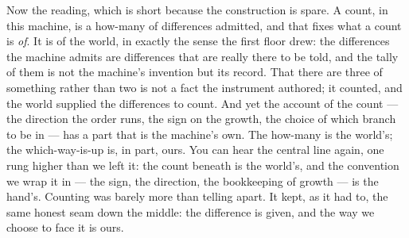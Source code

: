 Now the reading, which is short because the construction is spare. A count, in this machine, is a how-many of
differences admitted, and that fixes what a count is \emph{of}. It is of the world, in exactly the sense the
first floor drew: the differences the machine admits are differences that are really there to be told, and the tally
of them is not the machine's invention but its record. That there are three of something rather than two is not a
fact the instrument authored; it counted, and the world supplied the differences to count. And yet the account of
the count --- the direction the order runs, the sign on the growth, the choice of which branch to be in --- has a
part that is the machine's own. The how-many is the world's; the which-way-is-up is, in part, ours. You can hear
the central line again, one rung higher than we left it: the count beneath is the world's, and the convention
we wrap it in --- the sign, the direction, the bookkeeping of growth --- is the hand's. Counting was barely more
than telling apart. It kept, as it had to, the same honest seam down the middle: the difference is given, and the
way we choose to face it is ours.

